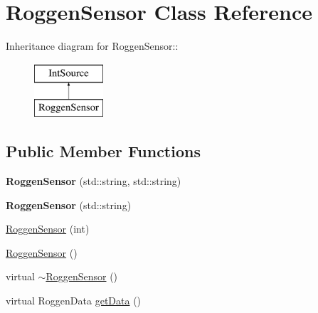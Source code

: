 \hypertarget{classRoggenSensor}{
\section{RoggenSensor Class Reference}
\label{classRoggenSensor}
}
Inheritance diagram for RoggenSensor::\begin{figure}[H]
\begin{center}
\leavevmode
\includegraphics[height=2cm]{classRoggenSensor}
\end{center}
\end{figure}
\subsection*{Public Member Functions}
\begin{DoxyCompactItemize}
\item 
\hypertarget{classRoggenSensor_ab58b74cb59244950881dba0b01e09fd5}{
{\bfseries RoggenSensor} (std::string, std::string)}
\label{classRoggenSensor_ab58b74cb59244950881dba0b01e09fd5}

\item 
\hypertarget{classRoggenSensor_af769216d0a6ececa2c280df1e66d950f}{
{\bfseries RoggenSensor} (std::string)}
\label{classRoggenSensor_af769216d0a6ececa2c280df1e66d950f}

\item 
\hyperlink{classRoggenSensor_a389b05fdb6e19f82241ac1d33cb07b59}{RoggenSensor} (int)
\item 
\hyperlink{classRoggenSensor_afe189b0bcb2e2eaf7090f60e3277eec4}{RoggenSensor} ()
\item 
virtual \hyperlink{classRoggenSensor_acd713d1615cd040b8691e24beb21c73e}{$\sim$RoggenSensor} ()
\item 
virtual RoggenData \hyperlink{classRoggenSensor_a296d8de06a1a0d3e0645389a34f42865}{getData} ()
\end{DoxyCompactItemize}


